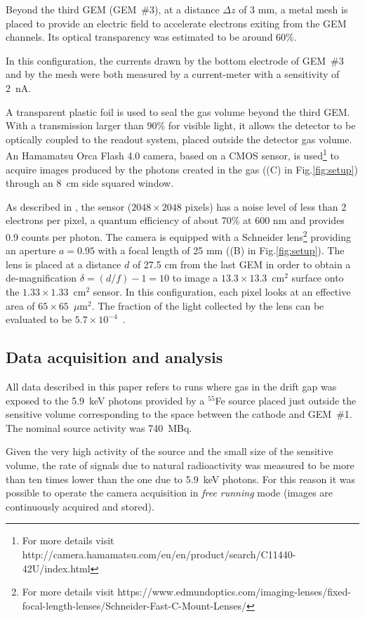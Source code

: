 \documentclass[a4paper,11pt]{article}
\begin{document}
Beyond the third GEM (GEM~\#3), at a distance $\Delta z$ of 3 mm, a metal mesh is placed to provide an electric field to accelerate electrons exiting from the GEM channels. Its optical transparency was estimated to be around 60\%.

In this configuration, the currents drawn by the bottom electrode of GEM~\#3 and by the mesh were both measured by a current-meter with a sensitivity of 2~nA.

A transparent plastic foil
is used to seal the gas volume beyond the third GEM.
With a transmission larger than 90\% for visible light, 
it allows the detector to be optically coupled to the readout system, 
placed outside the detector gas volume.
An Hamamatsu Orca Flash 4.0 camera, based on a CMOS sensor, 
is used\footnote{For more details visit http://camera.hamamatsu.com/eu/en/product/search/C11440-42U/index.html}
to acquire images produced by the photons created in the gas ((C) in Fig.\ref{fig:setup})
through an 8~cm side squared window. 

As described in \cite{bib:jinst_orange1},
the sensor ($2048 \times 2048$ pixels) 
has a noise level of less than 2 electrons per pixel,
a quantum efficiency of about 70\% at 600 nm
and provides 0.9 counts per photon.
The camera is equipped with a Schneider 
lens\footnote{For more details visit https://www.edmundoptics.com/imaging-lenses/fixed-focal-length-lenses/Schneider-Fast-C-Mount-Lenses/} 
providing an aperture $a = 0.95$ with a focal length of 25 mm ((B) in Fig.\ref{fig:setup}).
The lens is placed at a distance $d$ of 27.5 cm from the last GEM
in order to obtain a de-magnification 
$\delta = (d/f) - 1 = 10$ to 
image a $13.3 \times 13.3$~cm$^2$ surface onto the 
$1.33 \times 1.33$~cm$^2$ sensor. 
In this configuration, each pixel
looks at an effective area of 
$65 \times 65$~$\mu$m$^2$.
The fraction of the light collected by the lens can be evaluated to be $5.7 \times 10^{-4}$~\cite{bib:ieee_orange}.

\subsection{Data acquisition and analysis}

All data described in this paper refers to runs where gas in the drift gap was exposed to the 5.9~keV photons provided by a $^{55}$Fe source placed just outside the sensitive volume corresponding to the space between the cathode and GEM~\#1.
The nominal source activity was 740~MBq.

Given the very high activity of the source and the small size of the sensitive volume, the rate of signals due to natural radioactivity was measured to be more than ten times lower than the one due to 5.9~keV photons. For this reason it was possible to operate the camera acquisition in {\it free running} mode (images are continuously acquired and stored).
\end{document}
